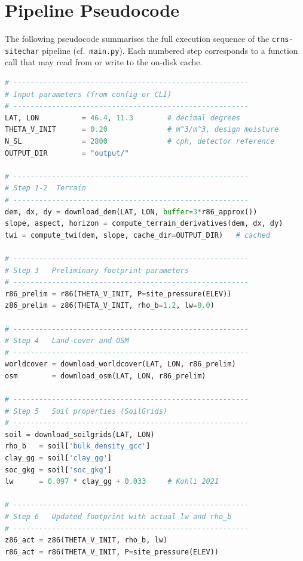 \section{Pipeline Pseudocode}
\label{app:pipeline}

The following pseudocode summarises the full execution sequence of
the \texttt{crns-sitechar} pipeline (cf.\ \texttt{main.py}).
Each numbered step corresponds to a function call that may read from
or write to the on-disk cache.

\begin{lstlisting}[language=Python, caption={CRNS site characterization
  pipeline — top-level pseudocode (main.py).},
  label={lst:pipeline}]
# -------------------------------------------------------
# Input parameters (from config or CLI)
# -------------------------------------------------------
LAT, LON          = 46.4, 11.3        # decimal degrees
THETA_V_INIT      = 0.20              # m^3/m^3, design moisture
N_SL              = 2800              # cph, detector reference
OUTPUT_DIR        = "output/"

# -------------------------------------------------------
# Step 1-2  Terrain
# -------------------------------------------------------
dem, dx, dy = download_dem(LAT, LON, buffer=3*r86_approx())
slope, aspect, horizon = compute_terrain_derivatives(dem, dx, dy)
twi = compute_twi(dem, slope, cache_dir=OUTPUT_DIR)   # cached

# -------------------------------------------------------
# Step 3   Preliminary footprint parameters
# -------------------------------------------------------
r86_prelim = r86(THETA_V_INIT, P=site_pressure(ELEV))
z86_prelim = z86(THETA_V_INIT, rho_b=1.2, lw=0.0)

# -------------------------------------------------------
# Step 4   Land-cover and OSM
# -------------------------------------------------------
worldcover = download_worldcover(LAT, LON, r86_prelim)
osm        = download_osm(LAT, LON, r86_prelim)

# -------------------------------------------------------
# Step 5   Soil properties (SoilGrids)
# -------------------------------------------------------
soil = download_soilgrids(LAT, LON)
rho_b   = soil['bulk_density_gcc']
clay_gg = soil['clay_gg']
soc_gkg = soil['soc_gkg']
lw      = 0.097 * clay_gg + 0.033     # Kohli 2021

# -------------------------------------------------------
# Step 6   Updated footprint with actual lw and rho_b
# -------------------------------------------------------
z86_act = z86(THETA_V_INIT, rho_b, lw)
r86_act = r86(THETA_V_INIT, P=site_pressure(ELEV))


\end{lstlisting}
